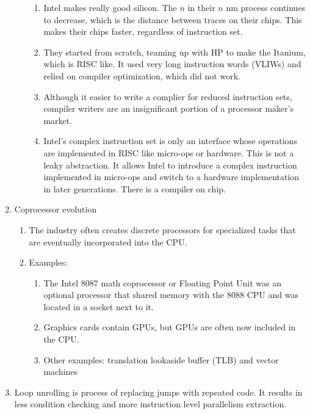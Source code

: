 \documentclass[twoside]{article}
\begin{document}
\begin{enumerate}
\begin{enumerate}
				\begin{enumerate}
					\item Intel makes really good silicon. The $n$ in their $n$ nm process continues
						to decrease, which is the distance between traces on their chips. This makes
						their chips faster, regardless of instruction set.
					\item They started from scratch, teaming up with HP to make the Itanium, which is
						RISC like. It used very long instruction words (VLIWs) and relied on compiler
						optimization, which did not work.
					\item Although it easier to write a complier for reduced instruction sets, compiler
						writers are an insignificant portion of a processor maker's market.
					\item Intel's complex instruction set is only an interface whose operations are
						implemented in RISC like micro-ops or hardware. This is not a leaky abstraction.
						It allows Intel to introduce a complex instruction implemented in micro-ops
						and switch to a hardware implementation in later generations. There is a compiler
						on chip.
				\end{enumerate}
		\end{enumerate}
	\item Coprocessor evolution
		\begin{enumerate}
			\item The industry often creates discrete processors for specialized tasks that are eventually
				incorporated into the CPU.
			\item Examples:
				\begin{enumerate}
					\item The Intel 8087 math coprocessor or Floating Point Unit was an optional processor
						that shared memory with the 8088 CPU and was located in a socket next to it.
					\item Graphics cards contain GPUs, but GPUs are often now included in the CPU.
					\item Other examples: translation lookaside buffer (TLB) and vector machines
				\end{enumerate}
		\end{enumerate}
	\item Loop unrolling is process of replacing jumps with repeated code. It results in less
		condition checking and more instruction level parallelism extraction.
\end{enumerate}
\end{document}
